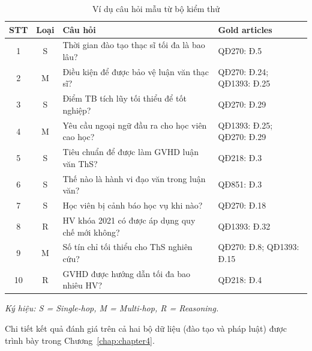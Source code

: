 \begin{table}[htbp]
    \centering
    \caption{Ví dụ câu hỏi mẫu từ bộ kiểm thử}
    \label{tab:vidu_cauhoi}
    \begin{tabular}{ccp{6.5cm}p{3cm}}
        \toprule
        \textbf{STT} & \textbf{Loại} & \textbf{Câu hỏi} & \textbf{Gold articles} \\
        \midrule
        1  & S & Thời gian đào tạo thạc sĩ tối đa là bao lâu?
           & QĐ270: Đ.5 \\
        2  & M & Điều kiện để được bảo vệ luận văn thạc sĩ?
           & QĐ270: Đ.24; QĐ1393: Đ.25 \\
        3  & S & Điểm TB tích lũy tối thiểu để tốt nghiệp?
           & QĐ270: Đ.29 \\
        4  & M & Yêu cầu ngoại ngữ đầu ra cho học viên cao học?
           & QĐ1393: Đ.25; QĐ270: Đ.29 \\
        5  & S & Tiêu chuẩn để được làm GVHD luận văn ThS?
           & QĐ218: Đ.3 \\
        6  & S & Thế nào là hành vi đạo văn trong luận văn?
           & QĐ851: Đ.3 \\
        7  & S & Học viên bị cảnh báo học vụ khi nào?
           & QĐ270: Đ.18 \\
        8  & R & HV khóa 2021 có được áp dụng quy chế mới không?
           & QĐ1393: Đ.32 \\
        9  & M & Số tín chỉ tối thiểu cho ThS nghiên cứu?
           & QĐ270: Đ.8; QĐ1393: Đ.15 \\
        10 & R & GVHD được hướng dẫn tối đa bao nhiêu HV?
           & QĐ218: Đ.4 \\
        \bottomrule
    \end{tabular}
\end{table}

\noindent\textit{Ký hiệu: S = Single-hop, M = Multi-hop, R = Reasoning.}

Chi tiết kết quả đánh giá trên cả hai bộ dữ liệu (đào tạo và pháp luật) được trình
bày trong Chương~\ref{chap:chapter4}.
